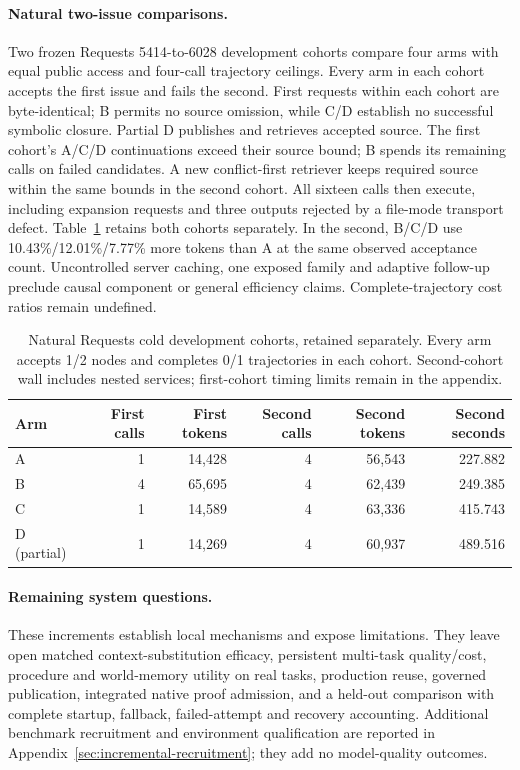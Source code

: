 \paragraph{Natural two-issue comparisons.}
Two frozen Requests 5414-to-6028 development cohorts compare four arms with
equal public access and four-call trajectory ceilings. Every arm in each
cohort accepts the first issue and fails the second. First requests within
each cohort are byte-identical; B permits no source omission, while C/D
establish no successful symbolic closure. Partial D publishes and retrieves
accepted source. The first cohort's A/C/D continuations exceed their source
bound; B spends its remaining calls on failed candidates. A new conflict-first
retriever keeps required source within the same bounds in the second cohort.
All sixteen calls then execute, including expansion requests and three outputs
rejected by a file-mode transport defect. Table~\ref{tab:requests-cold} retains
both cohorts separately. In the second, B/C/D use 10.43\%/12.01\%/7.77\% more
tokens than A at the same observed acceptance count. Uncontrolled server caching,
one exposed family and adaptive follow-up preclude causal component or general
efficiency claims. Complete-trajectory cost ratios remain undefined.

\begin{table}[htbp]
\centering
\caption{Natural Requests cold development cohorts, retained separately.
Every arm accepts 1/2 nodes and completes 0/1 trajectories in each cohort.
Second-cohort wall includes nested services; first-cohort timing limits remain
in the appendix.}
\label{tab:requests-cold}
\begin{tabular}{lrrrrr}
\toprule
Arm & First calls & First tokens & Second calls & Second tokens & Second seconds \\
\midrule
A & 1 & 14,428 & 4 & 56,543 & 227.882 \\
B & 4 & 65,695 & 4 & 62,439 & 249.385 \\
C & 1 & 14,589 & 4 & 63,336 & 415.743 \\
D (partial) & 1 & 14,269 & 4 & 60,937 & 489.516 \\
\bottomrule
\end{tabular}
\end{table}

\paragraph{Remaining system questions.}
These increments establish local mechanisms and expose limitations. They leave
open matched context-substitution efficacy, persistent multi-task quality/cost,
procedure and world-memory utility on real tasks, production reuse, governed
publication, integrated native proof admission, and a held-out comparison with complete
startup, fallback, failed-attempt and recovery accounting.
Additional benchmark recruitment and environment qualification are reported in
Appendix~\ref{sec:incremental-recruitment}; they add no model-quality outcomes.
